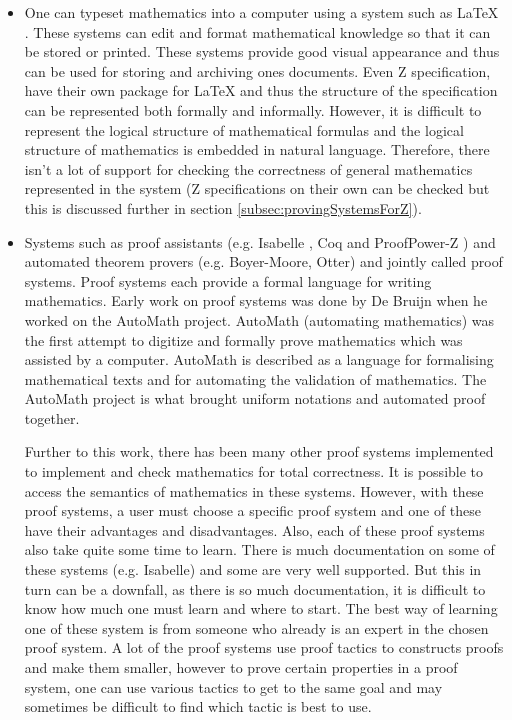 \begin{itemize}
\item One can typeset mathematics into a computer using a system such as \LaTeX{} \cite{latex} . These systems can edit and format mathematical knowledge so that it can be stored or printed. These systems provide good visual appearance and thus can be used for storing and archiving ones documents. Even Z specification, have their own package for \LaTeX{} and thus the structure of the specification can be represented both formally and informally. However, it is difficult to represent the logical structure of mathematical formulas and the logical structure of mathematics is embedded in natural language. Therefore, there isn't a lot of support for checking the correctness of general mathematics represented in the system (Z specifications on their own can be checked but this is discussed further in section \ref{subsec:provingSystemsForZ}).

\item Systems such as proof assistants (e.g. Isabelle \cite{isabelle}, Coq \cite{coq} and ProofPower-Z \cite{pp}) and automated theorem provers (e.g. Boyer-Moore, Otter) and jointly called proof systems. Proof systems each provide a formal language for writing mathematics. Early work on proof systems was done by De Bruijn when he worked on the AutoMath \cite{selectedautomath} project. AutoMath (automating mathematics) was the first attempt to digitize and formally prove mathematics which was assisted by a computer. AutoMath is described as a language for formalising mathematical texts and for automating the validation of mathematics. The AutoMath project is what brought uniform notations and automated proof together.

Further to this work, there has been many other proof systems implemented to implement and check mathematics for total correctness. It is possible to access the semantics of mathematics in these systems. However, with these proof systems, a user must choose a specific proof system and one of these have their advantages and disadvantages. Also, each of these proof systems also take quite some time to learn. There is much documentation on some of these systems (e.g. Isabelle) and some are very well supported. But this in turn can be a downfall, as there is so much documentation, it is difficult to know how much one must learn and where to start. The best way of learning one of these system is from someone who already is an expert in the chosen proof system. A lot of the proof systems use proof tactics to constructs proofs and make them smaller, however to prove certain properties in a proof system, one can use various tactics to get to the same goal and may sometimes be difficult to find which tactic is best to use.


\end{itemize}
